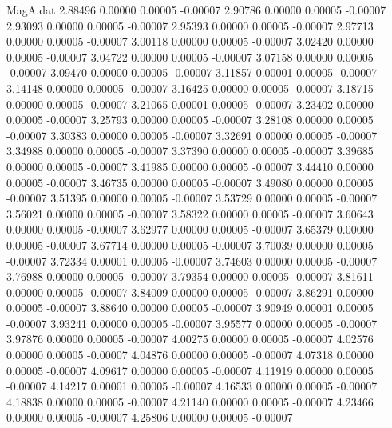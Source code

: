 \begin{filecontents}{MagA.dat}
   2.88496    0.00000    0.00005   -0.00007
   2.90786    0.00000    0.00005   -0.00007
   2.93093    0.00000    0.00005   -0.00007
   2.95393    0.00000    0.00005   -0.00007
   2.97713    0.00000    0.00005   -0.00007
   3.00118    0.00000    0.00005   -0.00007
   3.02420    0.00000    0.00005   -0.00007
   3.04722    0.00000    0.00005   -0.00007
   3.07158    0.00000    0.00005   -0.00007
   3.09470    0.00000    0.00005   -0.00007
   3.11857    0.00001    0.00005   -0.00007
   3.14148    0.00000    0.00005   -0.00007
   3.16425    0.00000    0.00005   -0.00007
   3.18715    0.00000    0.00005   -0.00007
   3.21065    0.00001    0.00005   -0.00007
   3.23402    0.00000    0.00005   -0.00007
   3.25793    0.00000    0.00005   -0.00007
   3.28108    0.00000    0.00005   -0.00007
   3.30383    0.00000    0.00005   -0.00007
   3.32691    0.00000    0.00005   -0.00007
   3.34988    0.00000    0.00005   -0.00007
   3.37390    0.00000    0.00005   -0.00007
   3.39685    0.00000    0.00005   -0.00007
   3.41985    0.00000    0.00005   -0.00007
   3.44410    0.00000    0.00005   -0.00007
   3.46735    0.00000    0.00005   -0.00007
   3.49080    0.00000    0.00005   -0.00007
   3.51395    0.00000    0.00005   -0.00007
   3.53729    0.00000    0.00005   -0.00007
   3.56021    0.00000    0.00005   -0.00007
   3.58322    0.00000    0.00005   -0.00007
   3.60643    0.00000    0.00005   -0.00007
   3.62977    0.00000    0.00005   -0.00007
   3.65379    0.00000    0.00005   -0.00007
   3.67714    0.00000    0.00005   -0.00007
   3.70039    0.00000    0.00005   -0.00007
   3.72334    0.00001    0.00005   -0.00007
   3.74603    0.00000    0.00005   -0.00007
   3.76988    0.00000    0.00005   -0.00007
   3.79354    0.00000    0.00005   -0.00007
   3.81611    0.00000    0.00005   -0.00007
   3.84009    0.00000    0.00005   -0.00007
   3.86291    0.00000    0.00005   -0.00007
   3.88640    0.00000    0.00005   -0.00007
   3.90949    0.00001    0.00005   -0.00007
   3.93241    0.00000    0.00005   -0.00007
   3.95577    0.00000    0.00005   -0.00007
   3.97876    0.00000    0.00005   -0.00007
   4.00275    0.00000    0.00005   -0.00007
   4.02576    0.00000    0.00005   -0.00007
   4.04876    0.00000    0.00005   -0.00007
   4.07318    0.00000    0.00005   -0.00007
   4.09617    0.00000    0.00005   -0.00007
   4.11919    0.00000    0.00005   -0.00007
   4.14217    0.00001    0.00005   -0.00007
   4.16533    0.00000    0.00005   -0.00007
   4.18838    0.00000    0.00005   -0.00007
   4.21140    0.00000    0.00005   -0.00007
   4.23466    0.00000    0.00005   -0.00007
   4.25806    0.00000    0.00005   -0.00007

\end{filecontents}
